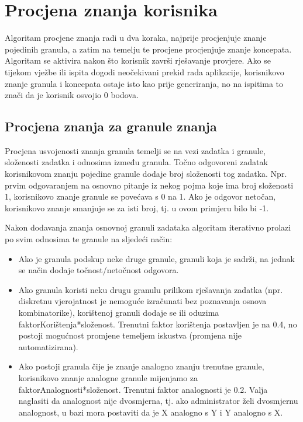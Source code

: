 \documentclass[times, utf8, zavrsni, numeric]{fer}
\begin{document}
\section{Procjena znanja korisnika}
Algoritam procjene znanja radi u dva koraka, najprije procjenjuje znanje pojedinih granula, a zatim na temelju te procjene procjenjuje znanje koncepata. Algoritam se aktivira nakon što korisnik završi rješavanje provjere. Ako se tijekom vježbe ili ispita dogodi neočekivani prekid rada aplikacije, korisnikovo znanje granula i koncepata ostaje isto kao prije generiranja, no na ispitima to znači da je korisnik osvojio 0 bodova.

\subsection{Procjena znanja za granule znanja}
Procjena usvojenosti znanja granula temelji se na vezi zadatka i granule, složenosti zadatka i odnosima između granula. Točno odgovoreni zadatak korisnikovom znanju pojedine granule dodaje broj složenosti tog zadatka. Npr. prvim odgovaranjem na osnovno pitanje iz nekog pojma koje ima broj složenosti 1, korisnikovo znanje granule se povećava s 0 na 1. Ako je odgovor netočan, korisnikovo znanje smanjuje se za isti broj, tj. u ovom primjeru bilo bi -1.
\par
Nakon dodavanja znanja osnovnoj granuli zadataka algoritam iterativno prolazi po svim odnosima te granule na sljedeći način:
\begin{itemize}
	\item Ako je granula podskup neke druge granule, granuli koja je sadrži, na jednak se način dodaje točnost/netočnost odgovora.
	\item Ako granula koristi neku drugu granulu prilikom rješavanja zadatka (npr. diskretnu vjerojatnost je nemoguće izračunati bez poznavanja osnova kombinatorike), korištenoj granuli dodaje se ili oduzima faktorKorištenja*složenost. Trenutni faktor korištenja postavljen je na 0.4, no postoji mogućnost promjene temeljem iskustva (promjena nije automatizirana).
	\item Ako postoji granula čije je znanje analogno znanju trenutne granule, korisnikovo znanje analogne granule mijenjamo za faktorAnalognosti*složenost. Trenutni faktor analognosti je 0.2. Valja naglasiti da analognost nije dvosmjerna, tj. ako administrator želi dvosmjernu analognost, u bazi mora postaviti da je X analogno s Y i Y analogno s X.
\end{itemize}
\end{document}
